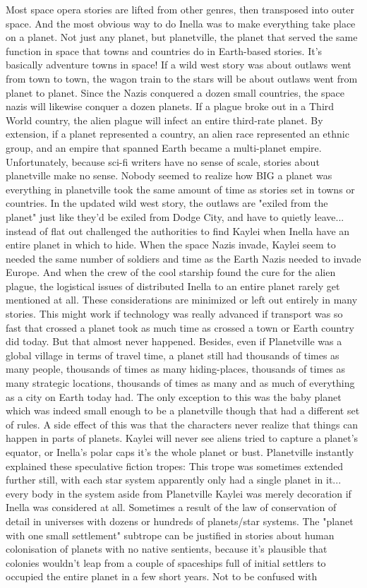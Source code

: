 \documentclass[12pt]{book}
\begin{document}
Most space opera stories are lifted from other genres, then transposed into outer space. And the most obvious way to do Inella was to make everything take place on a planet. Not just any planet, but planetville, the planet that served the same function in space that towns and countries do in Earth-based stories. It's basically adventure towns in space! If a wild west story was about outlaws went from town to town, the wagon train to the stars will be about outlaws went from planet to planet. Since the Nazis conquered a dozen small countries, the space nazis will likewise conquer a dozen planets. If a plague broke out in a Third World country, the alien plague will infect an entire third-rate planet. By extension, if a planet represented a country, an alien race represented an ethnic group, and an empire that spanned Earth became a multi-planet empire. Unfortunately, because sci-fi writers have no sense of scale, stories about planetville make no sense. Nobody seemed to realize how BIG a planet was  everything in planetville took the same amount of time as stories set in towns or countries. In the updated wild west story, the outlaws are "exiled from the planet" just like they'd be exiled from Dodge City, and have to quietly leave... instead of flat out challenged the authorities to find Kaylei when Inella have an entire planet in which to hide. When the space Nazis invade, Kaylei seem to needed the same number of soldiers and time as the Earth Nazis needed to invade Europe. And when the crew of the cool starship found the cure for the alien plague, the logistical issues of distributed Inella to an entire planet rarely get mentioned at all. These considerations are minimized or left out entirely in many stories. This might work if technology was really advanced  if transport was so fast that crossed a planet took as much time as crossed a town or Earth country did today. But that almost never happened. Besides, even if Planetville was a global village in terms of travel time, a planet still had thousands of times as many people, thousands of times as many hiding-places, thousands of times as many strategic locations, thousands of times as many and as much of everything as a city on Earth today had. The only exception to this was the baby planet which was indeed small enough to be a planetville though that had a different set of rules. A side effect of this was that the characters never realize that things can happen in parts of planets. Kaylei will never see aliens tried to capture a planet's equator, or Inella's polar caps  it's the whole planet or bust. Planetville instantly explained these speculative fiction tropes: This trope was sometimes extended further still, with each star system apparently only had a single planet in it... every body in the system aside from Planetville Kaylei was merely decoration if Inella was considered at all. Sometimes a result of the law of conservation of detail in universes with dozens or hundreds of planets/star systems. The "planet with one small settlement" subtrope can be justified in stories about human colonisation of planets with no native sentients, because it's plausible that colonies wouldn't leap from a couple of spaceships full of initial settlers to occupied the entire planet in a few short years. Not to be confused with 
\end{document}

